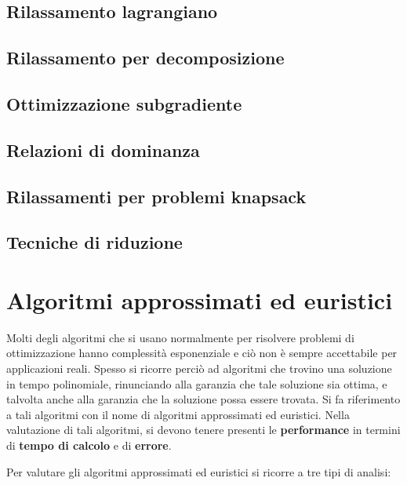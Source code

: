 \documentclass[11pt, oneside]{book}
\begin{document}
\section{Rilassamento lagrangiano}
\section{Rilassamento per decomposizione}
\section{Ottimizzazione subgradiente}
\section{Relazioni di dominanza}
\section{Rilassamenti per problemi knapsack}
\section{Tecniche di riduzione}


\chapter{Algoritmi approssimati ed euristici}

Molti degli algoritmi che si usano normalmente per risolvere problemi
di ottimizzazione hanno complessit\`a esponenziale e ci\`o non \`e
sempre accettabile per applicazioni reali. Spesso si ricorre perci\`o
ad algoritmi che trovino una soluzione in tempo polinomiale,
rinunciando alla garanzia che tale soluzione sia ottima, e talvolta
anche alla garanzia che la soluzione possa essere trovata. Si fa
riferimento a tali algoritmi con il nome di algoritmi approssimati ed
euristici. Nella valutazione di tali algoritmi, si devono tenere
presenti le {\bf performance} in termini di {\bf tempo di calcolo} e
di {\bf errore}.

\par\bigskip

Per valutare gli algoritmi approssimati ed euristici si ricorre a tre
tipi di analisi:
\end{document}
